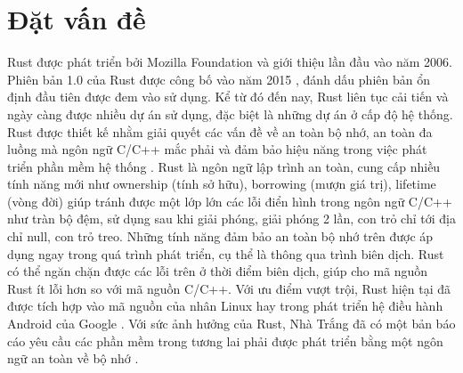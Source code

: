 \chapter{Đặt vấn đề}
\label{chap:introduction}

Rust được phát triển bởi Mozilla Foundation và giới thiệu lần đầu vào năm 2006.
Phiên bản 1.0 của Rust được công bố vào năm 2015 \cite{seidel2024bringing}, đánh dấu phiên bản ổn định đầu tiên được đem vào sử dụng.
Kể từ đó đến nay, Rust liên tục cải tiến và ngày càng được nhiều dự án sử dụng, đặc biệt là những dự án ở cấp độ hệ thống.
Rust được thiết kế nhằm giải quyết các vấn đề về an toàn bộ nhớ, an toàn đa luồng mà ngôn ngữ C/C++ mắc phải và đảm bảo hiệu năng trong việc phát triển phần mềm hệ thống \cite{je2020scientists}. %
Rust là ngôn ngữ lập trình an toàn, cung cấp nhiều tính năng mới như ownership (tính sở hữu), borrowing (mượn giá trị), lifetime (vòng đời) giúp tránh được một lớp lớn các lỗi điển hình trong ngôn ngữ C/C++ như tràn bộ đệm, sử dụng sau khi giải phóng, giải phóng 2 lần, con trỏ chỉ tới địa chỉ null, con trỏ treo.
Những tính năng đảm bảo an toàn bộ nhớ trên được áp dụng ngay trong quá trình phát triển, cụ thể là thông qua trình biên dịch.
Rust có thể ngăn chặn được các lỗi trên ở thời điểm biên dịch, giúp cho mã nguồn Rust ít lỗi hơn so với mã nguồn C/C++.
Với ưu điểm vượt trội, Rust hiện tại đã được tích hợp vào mã nguồn của nhân Linux \cite{kernelRustx2014} hay trong phát triển hệ điều hành Android của Google \cite{androidAndroidRust}. %
Với sức ảnh hưởng của Rust, Nhà Trắng đã có một bản báo cáo yêu cầu các phần mềm trong tương lai phải được phát triển bằng một ngôn ngữ an toàn về bộ nhớ \cite{whitehousePressRelease}.


